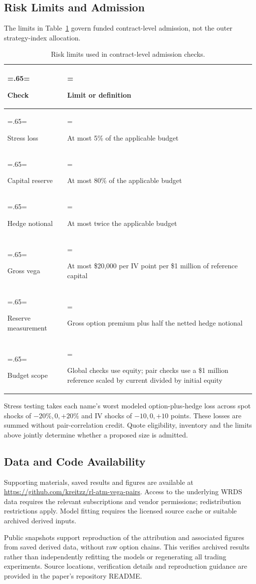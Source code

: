 \subsection{Risk Limits and Admission}\label{app:risk}

The limits in Table~\ref{tab:admission-risk-limits} govern funded contract-level admission, not the outer strategy-index allocation.

\begin{table}[H]\centering\small
\caption{Risk limits used in contract-level admission checks.}\label{tab:admission-risk-limits}
\setlength{\tabcolsep}{5pt}\renewcommand{\arraystretch}{1.25}
\begin{tabularx}{\textwidth}{@{}>{\hsize=.65\hsize\linewidth=\hsize\raggedright\arraybackslash}X>{\hsize=1.35\hsize\linewidth=\hsize\raggedright\arraybackslash}X@{}}\toprule
\textbf{Check} & \textbf{Limit or definition}\\\midrule
Stress loss & At most 5\% of the applicable budget\\[3pt]
Capital reserve & At most 80\% of the applicable budget\\[3pt]
Hedge notional & At most twice the applicable budget\\[3pt]
Gross vega & At most \$20,000 per IV point per \$1 million of reference capital\\[3pt]
Reserve measurement & Gross option premium plus half the netted hedge notional\\[3pt]
Budget scope & Global checks use equity; pair checks use a \$1 million reference scaled by current divided by initial equity\\
\bottomrule\end{tabularx}\end{table}

Stress testing takes each name's worst modeled option-plus-hedge loss across spot shocks of \(-20\%,0,+20\%\) and IV shocks of \(-10,0,+10\) points. These losses are summed without pair-correlation credit. Quote eligibility, inventory and the limits above jointly determine whether a proposed size is admitted.

\FloatBarrier

\subsection{Data and Code Availability}\label{app:reproduction}

Supporting materials, saved results and figures are available at \url{https://github.com/kreitzz/rl-atm-vega-pairs}. Access to the underlying WRDS data requires the relevant subscriptions and vendor permissions; redistribution restrictions apply. Model fitting requires the licensed source cache or suitable archived derived inputs.

Public snapshots support reproduction of the attribution and associated figures from saved derived data, without raw option chains. This verifies archived results rather than independently refitting the models or regenerating all trading experiments. Source locations, verification details and reproduction guidance are provided in the paper's repository README.
\FloatBarrier

